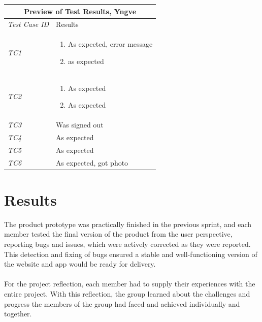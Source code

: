 \begin{minipage}{\linewidth}
\setlength{\tabcolsep}{15pt}
\centering
{}
\begin{tabular}{ |l|p{70mm}| }
	\hline
	\multicolumn{2}{|c|}{\cellcolor{gray!25} \textbf{Preview of Test Results, Yngve}} \\
	\hline
	\it{\cellcolor{gray!25}Test Case ID} & {\cellcolor{gray!25} Results } \\
	\hline
	\it{\cellcolor{gray!25}TC1} & \begin{enumerate}[label=\alph*)]
	                                \item As expected, error message
	                                \item as expected
	                              \end{enumerate}\\ \hline
	\it{\cellcolor{gray!25}TC2} & \begin{enumerate}[label=\alph*)]
	                                \item As expected
	                                \item As expected	
	                              \end{enumerate}\\ \hline
	\it{\cellcolor{gray!25}TC3} & Was signed out \\ \hline
	\it{\cellcolor{gray!25}TC4} & As expected \\ \hline
	\it{\cellcolor{gray!25}TC5} & As expected \\ \hline
	\it{\cellcolor{gray!25}TC6} & As expected, got photo \\ \hline
\end{tabular}
\medskip
\end{minipage}

\section{Results}
\label{sec:FinalResults}

The product prototype was practically finished in the previous sprint, and each member tested the final version of the product from the user perspective, reporting bugs and issues, which were actively corrected as they were reported. This detection and fixing of bugs ensured a stable and well-functioning version of the website and app would be ready for delivery. 

\paragraph{} For the project reflection, each member had to supply their experiences with the entire project. With this reflection, the group learned about the challenges and progress the members of the group had faced and achieved individually and together. 


